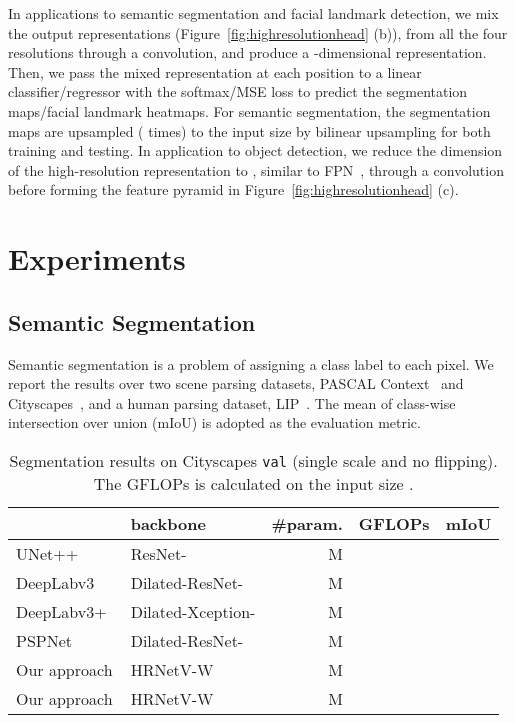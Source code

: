 \documentclass[10pt,twocolumn,letterpaper]{article}
\begin{document}
In applications to semantic segmentation
and facial landmark detection,
we mix the output representations (Figure~\ref{fig:highresolutionhead} (b)),
from all the four resolutions
through a  convolution,
and produce a -dimensional representation.
Then, we pass the mixed representation
at each position
to a linear classifier/regressor
with the softmax/MSE loss
to predict the segmentation maps/facial landmark heatmaps.
For semantic segmentation,
the segmentation maps are upsampled ( times)
to the input size by bilinear upsampling
for both training and testing.
In application to object detection,
we reduce the dimension of the high-resolution representation
to , similar to FPN~\cite{LinDGHHB17},
through a  convolution
before forming the feature pyramid in Figure~\ref{fig:highresolutionhead} (c).

\section{Experiments}
\subsection{Semantic Segmentation}
Semantic segmentation
is a problem of assigning
a class label to each pixel.
We report the results over
two scene parsing datasets, PASCAL Context~\cite{MottaghiCLCLFUY14} and
Cityscapes~\cite{CordtsORREBFRS16},
and a human parsing dataset, LIP~\cite{GongLSL17}. The mean of class-wise intersection over union (mIoU)
is adopted as the evaluation metric.

	\setlength{\tabcolsep}{6.0pt}
	\begin{table}[t]
		\scriptsize
		\centering
		\caption{Segmentation results on
		Cityscapes \texttt{val}
	    (single scale and no flipping).
		The GFLOPs is calculated on the input size .}
		\label{tab:cityscapevalresults}
		\begin{tabular}{l|lrr|c}
			\hline\noalign{\smallskip}
			 & backbone & \#param. & GFLOPs & mIoU\\
			 \hline
			
			 \hline
			UNet++~\cite{ZhouSTL18} & ResNet- & M &  &  \\
			DeepLabv3~\cite{ChenPSA17} & Dilated-ResNet- & M &  &  \\
			DeepLabv3+~\cite{ChenZPSA18} & Dilated-Xception- & M &  &  \\
			PSPNet~\cite{ZhaoSQWJ17} & Dilated-ResNet- & M &  &  \\
			\hline
			Our approach &  HRNetV-W & M &  &  \\
			Our approach & HRNetV-W & M &  &  \\
			\hline
		\end{tabular}
		\vspace{-4mm}
	\end{table}
\end{document}
